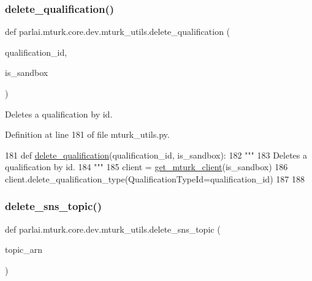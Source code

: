 \subsubsection{\texorpdfstring{delete\+\_\+qualification()}{delete\_qualification()}}
{\footnotesize\ttfamily def parlai.\+mturk.\+core.\+dev.\+mturk\+\_\+utils.\+delete\+\_\+qualification (\begin{DoxyParamCaption}\item[{}]{qualification\+\_\+id,  }\item[{}]{is\+\_\+sandbox }\end{DoxyParamCaption})}

\begin{DoxyVerb}Deletes a qualification by id.
\end{DoxyVerb}
 

Definition at line 181 of file mturk\+\_\+utils.\+py.


\begin{DoxyCode}
181 \textcolor{keyword}{def }\hyperlink{namespaceparlai_1_1mturk_1_1core_1_1mturk__utils_a389ca1d743e6319cb35916a6b0d7867d}{delete\_qualification}(qualification\_id, is\_sandbox):
182     \textcolor{stringliteral}{"""}
183 \textcolor{stringliteral}{    Deletes a qualification by id.}
184 \textcolor{stringliteral}{    """}
185     client = \hyperlink{namespaceparlai_1_1mturk_1_1core_1_1mturk__utils_a577e2527c04682284394b0951a090695}{get\_mturk\_client}(is\_sandbox)
186     client.delete\_qualification\_type(QualificationTypeId=qualification\_id)
187 
188 
\end{DoxyCode}
\mbox{\label{namespaceparlai_1_1mturk_1_1core_1_1dev_1_1mturk__utils_aa321f5dc5e9700bc3906fca85490e25e}} 
\subsubsection{\texorpdfstring{delete\+\_\+sns\+\_\+topic()}{delete\_sns\_topic()}}
{\footnotesize\ttfamily def parlai.\+mturk.\+core.\+dev.\+mturk\+\_\+utils.\+delete\+\_\+sns\+\_\+topic (\begin{DoxyParamCaption}\item[{}]{topic\+\_\+arn }\end{DoxyParamCaption})}



